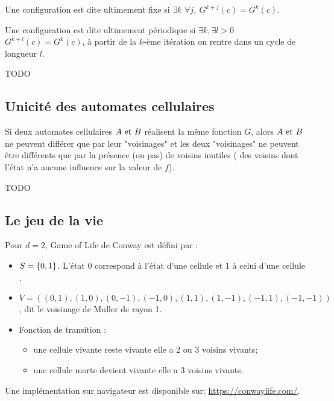 \begin{definition}
	Une configuration est dite ultimement fixe si $\exists k$ \tq $\forall j, \ G^{k+j}(c) =  G^{k}(c)$.
\end{definition}


\begin{definition}
	Une configuration est dite ultimement périodique si $\exists k, \exists l>0$ \tq $ G^{k+l}(c) =  G^{k}(c)$,
	\ie à partir de la $k$-ème itération on rentre dans un cycle de longueur $l$.
\end{definition}


\begin{exemple}
	TODO
\end{exemple}


\subsection{Unicité des automates cellulaires}


\begin{theorem}
	Si deux automates cellulaires $A \text{ et } B$ réalisent la même fonction $G$, alors $A \text{ et } B$ ne peuvent différer que par
	leur "voisinages" et les deux "voisinages" ne peuvent être différents que par la présence (ou pas) de voisins inutiles (\cad
	des voisins dont l'état n'a aucune influence sur la valeur de $f$).
\end{theorem}


\begin{exemple}
	TODO
\end{exemple}

\subsection{Le jeu de la vie}

\begin{exemple}
	Pour $d = 2$, Game of Life de Conway \cite{conwayGOL} est défini par :
	\begin{itemize}
		\item $S = \left\{0,1\right\}$. L'état 0 correspond à l'état d'une cellule  et 1 à celui d'une cellule .
		\item $V = ((0,1), (1,0), (0,-1), (-1,0), (1,1), (1,-1), (-1,1), (-1,-1))$, dit le voisinage de Muller de rayon 1.
		\item Fonction de transition :
		      \begin{itemize}
			      \item une cellule vivante reste vivante \ssi elle a 2 ou 3 voisins vivants;
			      \item une cellule morte devient vivante \ssi elle a 3 voisins vivants.
		      \end{itemize}
	\end{itemize}

	Une implémentation sur navigateur est disponible sur: \url{https://conwaylife.com/}.
\end{exemple}

